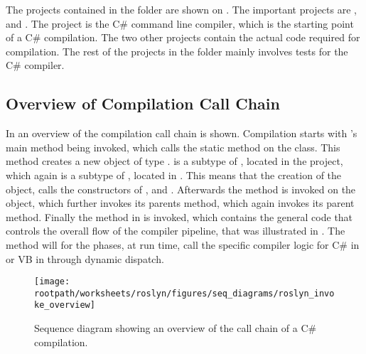 The projects contained in the  folder are shown on . The important projects are ,  and . The  project is the C\# command line compiler, which is the starting point of a C\# compilation. The two other projects contain the actual code required for compilation. The rest of the projects in the  folder mainly involves tests for the C\# compiler.

\subsection{Overview of Compilation Call Chain}\label{ssec:overview_chain}
In  an overview of the compilation call chain is shown. Compilation starts with 's main method being invoked, which calls the static  method on the  class. This method creates a new  object of type .  is a subtype of , located in the  project, which again is a subtype of , located in . This means that the creation of the  object, calls the constructors of ,  and . Afterwards the  method is invoked on the  object, which further invokes its parents  method, which again invokes its parent  method. Finally the  method in  is invoked, which contains the general code that controls the overall flow of the compiler pipeline, that was illustrated in . The  method will for the phases, at run time, call the specific compiler logic for C\# in \\  or \ac{VB} in  through dynamic dispatch.

\begin{sidewaysfigure}[htbp]
\centering
 \texttt{[image: \\rootpath/worksheets/roslyn/figures/seq\_diagrams/roslyn\_invoke\_overview]} 
 \caption{Sequence diagram showing an overview of the call chain of a C\# compilation.}
\label{fig:roslyn_invoke_overview}
\end{sidewaysfigure}

